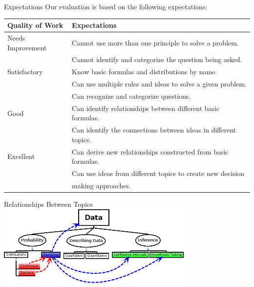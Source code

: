 \begin{frame}{Expectations}
\vspace*{-2em}
  Our evaluation is based on the following expectations: \\
\footnotesize \hspace*{-2em}
\begin{tabular}{|l@{\hspace{2em}}l|} \hline
  Quality of Work    & Expectations \\ \hline
  Needs Improvement  & Cannot use more than one principle to solve a problem. \\
                     & Cannot identify and categorize the question
                       being asked. \\ \hline
  Satisfactory       & Know basic formulas and distributions by name. \\
                     & Can use multiple rules and ideas to solve a
                       given problem.\\ 
                     & Can recognize and categorize questions. \\
 \hline
  Good               &  Can identify relationships between different
                        basic formulas. \\
                     &  Can identify the connections between ideas in
                        different topics. \\ \hline
  Excellent          &  Can derive new relationships constructed from
                        basic formulas. \\
                     &  Can use ideas from different topics to create
                        new decision \\
                     & making approaches. \\ \hline
\end{tabular}
\end{frame}

\begin{frame}{Relationships Between Topics}
  \includegraphics[height=4cm]{bigIdeas}
\end{frame}

